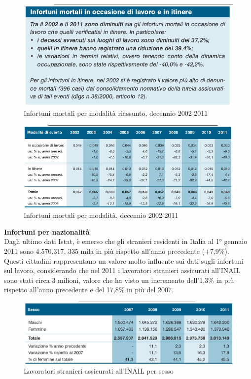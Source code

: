 \begin{figure}[H]
\centering
\includegraphics[scale=0.55]{images/cap4/analisiDiMercato/infortuniDecennioMortaliPerModalita1}
\caption{Infortuni mortali per modalità riassunto, decennio 2002-2011}
\end{figure}

\begin{figure}[H]
\centering
\includegraphics[scale=0.65]{images/cap4/analisiDiMercato/infortuniDecennioMortaliPerModalita2}
\caption{Infortuni mortali per modalità, decennio 2002-2011}
\end{figure}



\textbf{Infortuni per nazionalità}\\
Dagli ultimo dati Istat, è emerso che gli stranieri residenti in Italia al 1° gennaio 2011 sono 4.570.317, 335 mila in più rispetto all'anno precedente (+7,9\%).\\
Questi cittadini rappresentano un valore molto influente sui dati sugli infortuni sul lavoro, considerando che nel 2011 i lavoratori stranieri assicurati all'INAIL sono stati circa 3 milioni, valore che ha visto un incremento dell'1,3\% in più rispetto all'anno precedente e del 17,8\% in più del 2007.


\begin{figure}[H]
\centering
\includegraphics[scale=0.55]{images/cap4/analisiDiMercato/lavoratoriStranieri1}
\caption{Lavoratori stranieri assicurati all'INAIL per sesso}
\end{figure}

